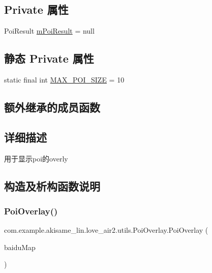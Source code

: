 \subsection*{Private 属性}
\begin{DoxyCompactItemize}
\item 
Poi\+Result \mbox{\hyperlink{classcom_1_1example_1_1akisame__lin_1_1love__air2_1_1utils_1_1_poi_overlay_a4d22b5d6a87e19a01cf6b754da20abc9}{m\+Poi\+Result}} = null
\end{DoxyCompactItemize}
\subsection*{静态 Private 属性}
\begin{DoxyCompactItemize}
\item 
static final int \mbox{\hyperlink{classcom_1_1example_1_1akisame__lin_1_1love__air2_1_1utils_1_1_poi_overlay_a0cabe0f660cf19ea4b449101abb76ad2}{M\+A\+X\+\_\+\+P\+O\+I\+\_\+\+S\+I\+ZE}} = 10
\end{DoxyCompactItemize}
\subsection*{额外继承的成员函数}


\subsection{详细描述}
用于显示poi的overly 

\subsection{构造及析构函数说明}
\mbox{\label{classcom_1_1example_1_1akisame__lin_1_1love__air2_1_1utils_1_1_poi_overlay_aac75a0e6f7786fe6de7eae966787d14e}} 
\subsubsection{\texorpdfstring{PoiOverlay()}{PoiOverlay()}}
{\footnotesize\ttfamily com.\+example.\+akisame\+\_\+lin.\+love\+\_\+air2.\+utils.\+Poi\+Overlay.\+Poi\+Overlay (\begin{DoxyParamCaption}\item[{Baidu\+Map}]{baidu\+Map }\end{DoxyParamCaption})\hspace{0.3cm}{\ttfamily [inline]}}

